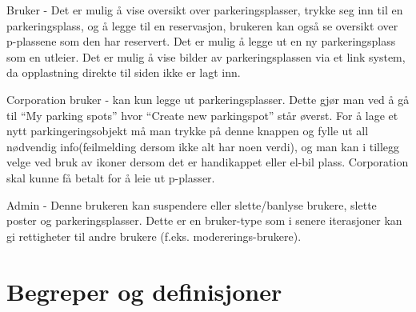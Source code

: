 \documentclass[12pt]{article}
\begin{document}
Bruker -  Det er mulig å vise oversikt over parkeringsplasser, trykke seg inn til en parkeringsplass, og å legge til en reservasjon, brukeren kan også se oversikt over p-plassene som den har reservert. Det er mulig å legge ut en ny parkeringsplass som en utleier. Det er mulig å vise bilder av parkeringsplassen via et link system, da opplastning direkte til siden ikke er lagt inn. 

Corporation bruker - kan kun legge ut parkeringsplasser. Dette gjør man ved å gå til “My parking spots” hvor “Create new parkingspot” står øverst. For å lage et nytt parkingeringsobjekt må man trykke på denne knappen og fylle ut all nødvendig info(feilmelding dersom ikke alt har noen verdi), og man kan i tillegg velge ved bruk av ikoner dersom det er handikappet eller el-bil plass. Corporation skal kunne få betalt for å leie ut p-plasser.

Admin - Denne brukeren kan suspendere eller slette/banlyse brukere, slette poster og parkeringsplasser. Dette er en bruker-type som i senere iterasjoner kan gi rettigheter til andre brukere (f.eks. modererings-brukere).


\section{Begreper og definisjoner}
\end{document}

